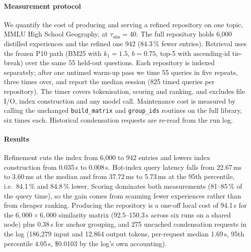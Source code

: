 
\paragraph{Measurement protocol}
We quantify the cost of producing and serving a refined repository on one topic, MMLU High School
Geography, at $\tau_{\mathrm{sim}}=40$. The full repository holds 6{,}000 distilled experiences and the
refined one 942 (84.3\,\% fewer entries). Retrieval uses the frozen P10 path (BM25 with $k_1=1.5$,
$b=0.75$, top-5 with ascending-id tie-break) over the same 55 held-out questions. Each repository is
indexed separately; after one untimed warm-up pass we time 55 queries in five repeats, three times over,
and report the median session (825 timed queries per repository). The timer covers tokenisation,
scoring and ranking, and excludes file I/O, index construction and any model call. Maintenance cost is
measured by calling the unchanged \texttt{build\_matrix} and \texttt{group\_ids} routines on the full
library, six times each. Historical condensation requests are re-read from the run log.

\paragraph{Results}
Refinement cuts the index from 6{,}000 to 942 entries and lowers index construction from 0.035\,s to
0.008\,s. Hot-index query latency falls from 22.67\,ms to 3.60\,ms at the median and from 37.72\,ms to
5.73\,ms at the 95th percentile, i.e.\ 84.1\,\% and 84.8\,\% lower. Scoring dominates both
measurements (81--85\,\% of the query time), so the gain comes from scanning fewer experiences rather
than from cheaper ranking. Producing the repository is a one-off local cost of 94.1\,s for the
$6{,}000\times6{,}000$ similarity matrix (92.5--150.3\,s across six runs on a shared node) plus
0.38\,s for anchor grouping, and 275 uncached condensation requests in the log (186{,}279 input and 12{,}864 output
tokens, per-request median 1.69\,s, 95th percentile 4.05\,s, \$0.0103 by the log's own accounting).
